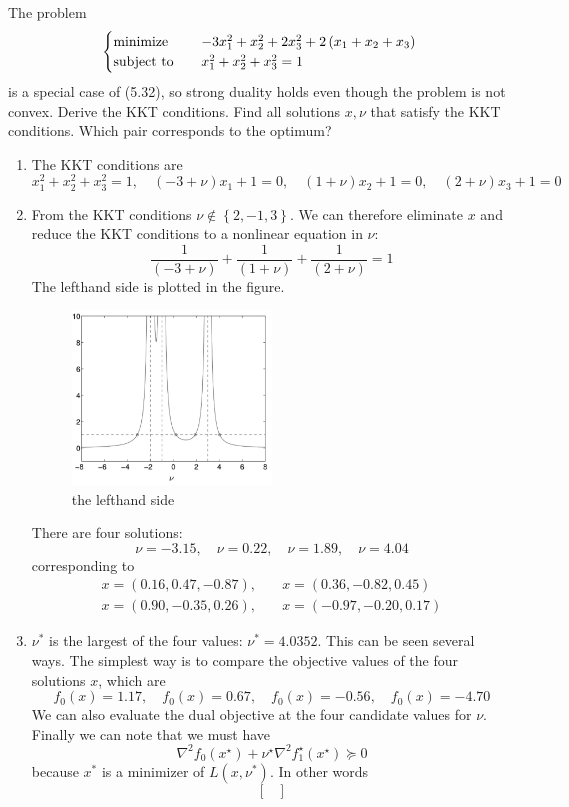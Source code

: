 \begin{problem}[5.29]
    The problem\[\begin{cases}
        \operatorname{minimize}\quad &-3 x_{1}^{2}+x_{2}^{2}+2 x_{3}^{2}+2\left(x_{1}+x_{2}+x_{3}\right)\\
        \operatorname{subject\ to}\quad &x_{1}^{2}+x_{2}^{2}+x_{3}^{2}=1 
    \end{cases}\]is a special case of (5.32), so strong duality holds even though the problem is not convex. Derive the KKT conditions. Find all solutions $x, \nu$ that satisfy the KKT conditions. Which pair corresponds to the optimum?
    \Answer \text{}\begin{enumerate}
        \item The KKT conditions are\[x_{1}^{2}+x_{2}^{2}+x_{3}^{2}=1, \quad(-3+\nu) x_{1}+1=0, \quad(1+\nu) x_{2}+1=0, \quad(2+\nu) x_{3}+1=0\]
        \item From the KKT conditions  $\nu \notin \left\{2, -1, 3\right\}$. We can therefore eliminate $x$ and reduce the KKT conditions to a nonlinear equation in $\nu$:\[\frac{1}{(-3 + \nu)} + \frac{1}{(1 + \nu)} + \frac{1}{(2 + \nu)} = 1\] The lefthand side is plotted in the figure. \begin{figure}[htbp]
            \centering
            \includegraphics[width=0.5\textwidth]{./figure/fig3.png}
            \caption{the lefthand side \label{fig3}}
        \end{figure}
        There are four solutions:\[\nu=-3.15, \quad \nu=0.22, \quad \nu=1.89, \quad \nu=4.04\] corresponding to \begin{align*}
            x=(0.16,0.47,-0.87),\quad & x=(0.36,-0.82,0.45) \\
            x=(0.90,-0.35,0.26),\quad & x=(-0.97,-0.20,0.17)
        \end{align*}
        \item $\nu^*$ is the largest of the four values: $\nu^* = 4.0352$. This can be seen several ways. The simplest way is to compare the objective values of the four solutions $x$, which are \[f_{0}(x)=1.17, \quad f_{0}(x)=0.67, \quad f_{0}(x)=-0.56, \quad f_{0}(x)=-4.70\]We can also evaluate the dual objective at the four candidate values for $\nu$. Finally we can note that we must have\[\nabla^{2} f_{0}\left(x^{\star}\right)+\nu^{\star} \nabla^{2} f_{1}^{\star}\left(x^{\star}\right) \succeq 0\] because $x^*$ is a minimizer of $L(x, \nu^*)$. In other words \[\begin{bmatrix}

\end{bmatrix}\]
\end{enumerate}
\end{problem}
